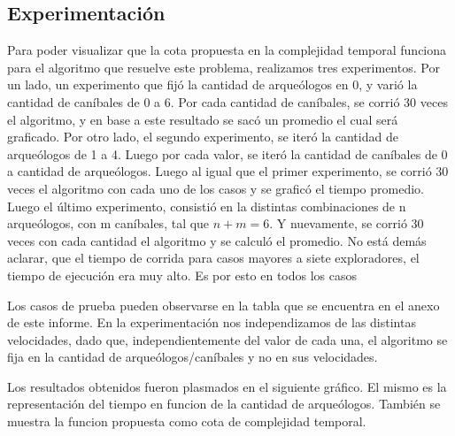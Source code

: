 
    \subsection{Experimentación}

	Para poder visualizar que la cota propuesta en la complejidad temporal funciona para el algoritmo que resuelve este problema, realizamos tres experimentos. Por un lado, un experimento que fijó la cantidad de arqueólogos en 0, y varió la cantidad de caníbales de 0 a 6. Por cada cantidad de caníbales, se corrió 30 veces el algoritmo, y en base a este resultado se sacó un promedio el cual será graficado. Por otro lado,  el segundo experimento, se iteró la cantidad de arqueólogos de 1 a 4. Luego por cada valor, se iteró la cantidad de caníbales de 0 a cantidad de arqueólogos. Luego al igual que el primer experimento, se corrió 30 veces el algoritmo con cada uno de los casos y se graficó el tiempo promedio. Luego el último experimento, consistió en la distintas combinaciones de n arqueólogos, con m caníbales, tal que $n+m = 6$. Y nuevamente, se corrió 30 veces con cada cantidad el algoritmo y se calculó el promedio.
	No está demás aclarar, que el tiempo de corrida para casos mayores a siete exploradores, el tiempo de ejecución era muy alto. Es por esto en todos los casos

  Los casos de prueba pueden observarse en la tabla que se encuentra en el anexo de este informe. En la experimentación nos independizamos de las distintas velocidades, dado que, independientemente del valor de cada una, el algoritmo se fija en la cantidad de arqueólogos/caníbales y no en sus velocidades.

  Los resultados obtenidos fueron plasmados en el siguiente gráfico. El mismo es la representación del tiempo en funcion de la cantidad de arqueólogos. También se muestra la funcion propuesta como cota de complejidad temporal.

